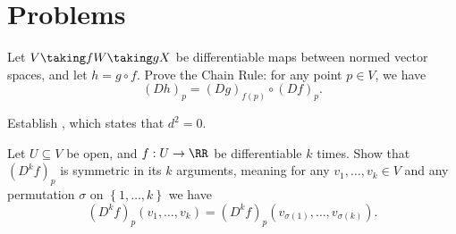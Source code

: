 \section{Problems}
\begin{problem}
	Let $V \taking f W \taking g X$ be differentiable maps between normed vector spaces,
	and let $h = g \circ f$.
	Prove the Chain Rule: for any point $p \in V$, we have
	\[ (Dh)_p = (Dg)_{f(p)} \circ (Df)_p. \]
\end{problem}
\begin{problem}
	\label{prob:dd_zero}
	Establish , which states that $d^2 = 0$.
\end{problem}
\begin{problem}
	Let $U \subseteq V$ be open, and $f : U \to \RR$ be differentiable $k$ times.
	Show that $(D^kf)_p$ is symmetric in its $k$ arguments, meaning for any $v_1, \dots, v_k \in V$
	and any permutation $\sigma$ on $\left\{ 1, \dots, k \right\}$ we have
	\[ (D^kf)_p(v_1, \dots, v_k) = (D^kf)_p(v_{\sigma(1)}, \dots, v_{\sigma(k)}). \]
\end{problem}


